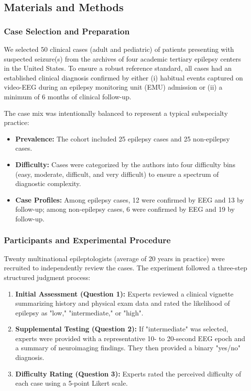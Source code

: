 \documentclass[num-refs]{wiley-article}
\begin{document}
\subsection*{Materials and Methods}

\subsubsection*{Case Selection and Preparation}

We selected 50 clinical cases (adult and pediatric) of patients presenting with suspected seizure(s) from the archives of four academic tertiary epilepsy centers in the United States. To ensure a robust reference standard, all cases had an established clinical diagnosis confirmed by either (i) habitual events captured on video-EEG during an epilepsy monitoring unit (EMU) admission or (ii) a minimum of 6 months of clinical follow-up.

The case mix was intentionally balanced to represent a typical subspecialty practice:
\begin{itemize}
    \item \textbf{Prevalence:} The cohort included 25 epilepsy cases and 25 non-epilepsy cases.
    \item \textbf{Difficulty:} Cases were categorized by the authors into four difficulty bins (easy, moderate, difficult, and very difficult) to ensure a spectrum of diagnostic complexity.
    \item \textbf{Case Profiles:} Among epilepsy cases, 12 were confirmed by EEG and 13 by follow-up; among non-epilepsy cases, 6 were confirmed by EEG and 19 by follow-up.
\end{itemize}

\subsubsection*{Participants and Experimental Procedure}

Twenty multinational epileptologists (average of 20 years in practice) were recruited to independently review the cases. The experiment followed a three-step structured judgment process:

\begin{enumerate}
    \item \textbf{Initial Assessment (Question 1):} Experts reviewed a clinical vignette summarizing history and physical exam data and rated the likelihood of epilepsy as "low," "intermediate," or "high".

    \item \textbf{Supplemental Testing (Question 2):} If "intermediate" was selected, experts were provided with a representative 10- to 20-second EEG epoch and a summary of neuroimaging findings. They then provided a binary "yes/no" diagnosis.

    \item \textbf{Difficulty Rating (Question 3):} Experts rated the perceived difficulty of each case using a 5-point Likert scale.
\end{enumerate}
\end{document}
